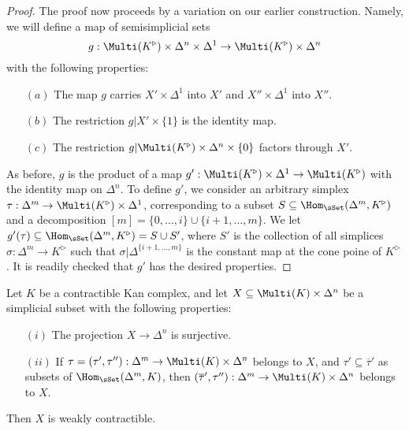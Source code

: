 \begin{proof}
The proof now proceeds by a variation on our earlier construction. Namely, we will define a map 
of semisimplicial sets
$$ g: \Multi(K^{\triangleright}) \times \Delta^n \times \Delta^1 \rightarrow 
\Multi(K^{\triangleright}) \times \Delta^n$$ with the following properties:
\begin{itemize}
\item[$(a)$] The map $g$ carries $X' \times \Delta^1$ into $X'$ and $X'' \times \Delta^1$ into $X''$.
\item[$(b)$] The restriction $g |X' \times \{1\}$ is the identity map.
\item[$(c)$] The restriction $g| \Multi(K^{\triangleright}) \times \Delta^n \times \{0\}$ factors through $X'$.
\end{itemize}
As before, $g$ is the product of a map $g': \Multi(K^{\triangleright}) \times \Delta^1 \rightarrow \Multi(K^{\triangleright})$ with the identity map on $\Delta^n$. To define $g'$, we consider an arbitrary simplex $\tau: \Delta^m \rightarrow \Multi(K^{\triangleright}) \times \Delta^1$, corresponding to a subset $S \subseteq \Hom_{\sSet}( \Delta^m, K^{\triangleright} )$ and a decomposition
$[m] = \{ 0, \ldots, i\} \cup \{i+1, \ldots, m\}$. We let $g'(\tau) \subseteq \Hom_{\sSet}(\Delta^m, K^{\triangleright} ) = S \cup S'$, where $S'$ is the collection of all simplices $\sigma: \Delta^m \rightarrow K^{\triangleright}$ such that $\sigma | \Delta^{ \{i+1, \ldots, m\} }$ is the constant map at the cone poine of $K^{\triangleright}$. It is readily checked that $g'$ has the desired properties.
\end{proof}

\begin{lemma}\label{toughfluff}
Let $K$ be a contractible Kan complex, and let $X \subseteq \Multi(K) \times \Delta^n$ be a simplicial subset with the following properties:
\begin{itemize}
\item[$(i)$] The projection $X \rightarrow \Delta^n$ is surjective.
\item[$(ii)$] If $\tau = (\tau', \tau''): \Delta^m \rightarrow \Multi(K) \times \Delta^n$ belongs to
$X$, and $\tau' \subseteq \overline{\tau}'$ as subsets of $\Hom_{\sSet}( \Delta^m, K)$, then
$(\overline{\tau}',\tau''): \Delta^m \rightarrow \Multi(K) \times \Delta^n$ belongs to $X$.
\end{itemize}
Then $X$ is weakly contractible.
\end{lemma}


